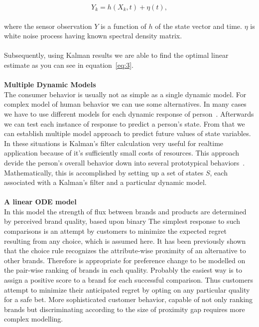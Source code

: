 \begin{equation} \label{eq:2}
Y_k = h(X_k, t) + \eta(t),
\end{equation}
\\
where the sensor observation $Y$ is a function of $h$ of the state vector and time. $\eta$ is white noise process having known spectral density matrix.\\
\\
Subsequently, using Kalman results we are able to find the optimal linear estimate as you can see in equation~\ref{eq:3}.\\
\\
\textbf{Multiple Dynamic Models} \label{subsec:multipleDynamicModels}\\
The consumer behavior is usually not as simple as a single dynamic model.
For complex model of human behavior we can use some alternatives.
In many cases we have to use different models for each dynamic response of person~\cite{wilsky}.
Afterwards we can test each instance of response to predict a person's state.
From that we can establish multiple model approach to predict future values of state variables.
In these situations is Kalman’s filter calculation very useful for realtime application because of it’s sufficiently small costs of resources.
This approach devide the person’s overall behavior down into several prototypical behaviors~\cite{pantland}.
Mathematically, this is accomplished by setting up a set of states $S$, each associated with a Kalman’s filter and a particular dynamic model.\\
\\
\textbf{A linear ODE model} \label{subsec:ode}\\
In this model the strength of flux between brands and products are determined by perceived brand quality, based upon binary
The simplest response to such comparisons is an attempt by customers to minimize the expected regret resulting from any choice, which is assumed here.
It has been previously shown that the choice rule recognizes the attribute-wise proximity of an alternative to other brands.
Therefore is appropriate for preference change to be modelled on the pair-wise ranking of brands in each quality.
Probably the easiest way is to assign a positive score to a brand for each successful comparison.
Thus customers attempt to minimize their anticipated regret by opting on any particular quality for a safe bet.
More sophisticated customer behavior, capable of not only ranking brands but discriminating according to the size of proximity gap requires more complex modelling.
